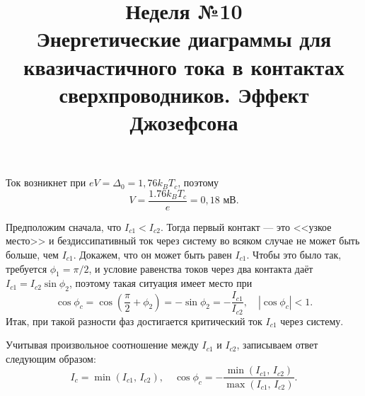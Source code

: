 \documentclass[a4paper]{article}
\title{Неделя №10\\
Энергетические диаграммы для квазичастичного тока в контактах сверхпроводников. Эффект Джозефсона}
\begin{document}
	\maketitle
\begin{hiProb}[Т10-4]
\end{hiProb}
\begin{sol}
\begin{figure}[ht]
    \centering
    \caption{}
    \label{fig:1}
\end{figure}
Ток возникнет при $eV=\Delta_0=1,76 k_B T_c$, поэтому
\[
V= \frac{1.76 k_B T_c}{e}= 0,18 \text{ мВ}
.\] 
\end{sol}
\begin{hiProb}[Т10-5]
\end{hiProb}
\begin{sol}
Предположим сначала, что $I_{c 1}< I_{c 2}$. Тогда первый контакт ---
это <<узкое место>> и бездиссипативный ток через систему во всяком
случае не может быть больше, чем $I_{c 1}$. Докажем, что
он может быть равен $I_{c 1}$. Чтобы это было так, требуется
$\phi_1 = \pi /2$, и условие равенства токов через два
контакта даёт $I_{c 1} = I_{c 2} \sin \phi_2$, поэтому такая
ситуация имеет место при
\[
	\cos \phi_c = \cos \left( \frac{\pi}{2}+ \phi_2 \right) 
	= - \sin \phi_2= - \frac{I_{c 1}}{I_{c 2}},\quad
	\left| \cos \phi_c \right| <1
.\]
Итак, при такой разности фаз достигается критический ток $I_{c 1}$ 
через систему.

Учитывая произвольное соотношение между $I_{c 1}$ и $I_{c 2}$,
записываем ответ следующим образом:
\[
	I_{c}= \min \left( I_{c 1},\, I_{c 2} \right) ,\quad
	\cos \phi_c= - \frac{\min \left( I_{c 1},\,I_{c 2} \right) }{
	\max \left( I_{c 1},\,I_{c 2} \right) }
.\] 
\end{sol}
\begin{hiProb}[Т10-6]
\end{hiProb}
\end{document}
